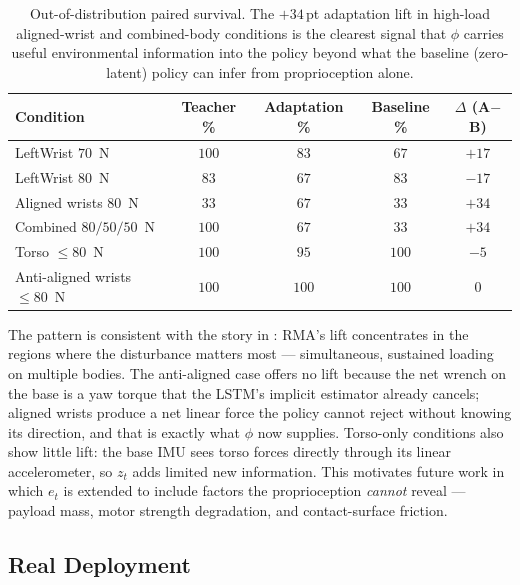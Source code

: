 \begin{table}[H]
\centering
\renewcommand{\arraystretch}{1.12}
\setlength{\tabcolsep}{6pt}
\begin{tabular}{lcccc}
\toprule
\textbf{Condition} & \textbf{Teacher \%} & \textbf{Adaptation \%} & \textbf{Baseline \%} & $\Delta$ (A$-$B) \\
\midrule
LeftWrist $70$~N                 & $100$ & $83$ & $67$ & $+17$ \\
LeftWrist $80$~N                 & $83$  & $67$ & $83$ & $-17$ \\
Aligned wrists $80$~N            & $33$  & $67$ & $33$ & $+34$ \\
Combined $80/50/50$~N            & $100$ & $67$ & $33$ & $+34$ \\
Torso $\leq 80$~N                & $100$ & $95$ & $100$ & $-5$  \\
Anti-aligned wrists $\leq 80$~N  & $100$ & $100$ & $100$ & $0$ \\
\bottomrule
\end{tabular}
\caption{Out-of-distribution paired survival. The $+34$\,pt adaptation
lift in high-load aligned-wrist and combined-body conditions is the
clearest signal that $\phi$ carries useful environmental information
into the policy beyond what the baseline (zero-latent) policy can
infer from proprioception alone.}
\label{tab:rma_ood}
\end{table}

The pattern is consistent with the story in
\citet{kumar2021rmarapidmotoradaptation}: RMA's lift concentrates in the
regions where the disturbance matters most --- simultaneous, sustained
loading on multiple bodies. The anti-aligned case offers no lift because
the net wrench on the base is a yaw torque that the LSTM's implicit
estimator already cancels; aligned wrists produce a net linear force the
policy cannot reject without knowing its direction, and that is exactly
what $\phi$ now supplies. Torso-only conditions also show little lift:
the base IMU sees torso forces directly through its linear accelerometer,
so $z_t$ adds limited new information. This motivates future work in which
$e_t$ is extended to include factors the proprioception \emph{cannot}
reveal --- payload mass, motor strength degradation, and contact-surface
friction.


\subsection{Real Deployment}
\label{sec:real_deploy}

